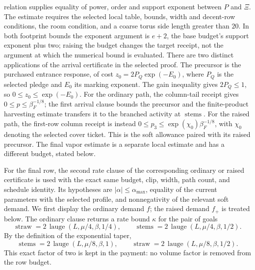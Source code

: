 relation supplies equality of power, order and support exponent between
$P$ and $\Xi$. The estimate requires the selected local table, bounds, width and
decent-row conditions, the room condition, and a coarse torus side length
greater than $20$. In both footprint bounds the exponent argument is
$e+2$, the base budget's support exponent plus two;
raising the budget changes the
target receipt, not the argument at which the numerical bound is evaluated.
There are two distinct applications of the arrival certificate in the
selected proof. The precursor is the purchased entrance response, of cost
$z_0=2P_Q\exp(-E_0)$, where $P_Q$ is the selected pledge and $E_0$ its
marking exponent. The gain inequality gives $2P_Q\leq1$, so
$0\leq z_0\leq\exp(-E_0)$. For the ordinary path, the column-tail
receipt gives $0\leq p\leq\beta_F^{-1/8}$; the first arrival clause
bounds the precursor and the finite-product harvesting estimate transfers
it to the branched activity at $\operatorname{stems}$. For the raised path, the first-row column receipt is instead
$0\leq p_3\leq\exp(\chi_0)\beta_F^{-1/8}$, with $\chi_0$ denoting the selected cover ticket. This is the soft allowance paired with its raised precursor. The
final vapor estimate is a separate local estimate and has a different
budget, stated below.

For the final row, the second rate clause of the corresponding ordinary or
raised certificate is used with the exact same budget, clip, width, path
count, and schedule identity. Its hypotheses are
$|\alpha|\leq\alpha_{\max}$, equality of the current parameters with the
selected profile, and nonnegativity of the relevant soft demand. We first
display the ordinary demand $f$; the raised demand $f_+$ is treated below.
The ordinary clause returns a rate bound $\kappa$ for the
pair of goals
\[
 \operatorname{straw}=2\,\operatorname{lauge}(L,\mu/4,\beta,1/4),
 \qquad
 \operatorname{stems}=2\,\operatorname{lauge}(L,\mu/4,\beta,1/2).
\]
By the definition of the exponential taper,
\[
 \operatorname{stems}=2\,\operatorname{lauge}(L,\mu/8,\beta,1),\qquad
 \operatorname{straw}=2\,\operatorname{lauge}(L,\mu/8,\beta,1/2).
\]
This exact factor of two is kept in the payment: no volume factor is
removed from the row budget.

